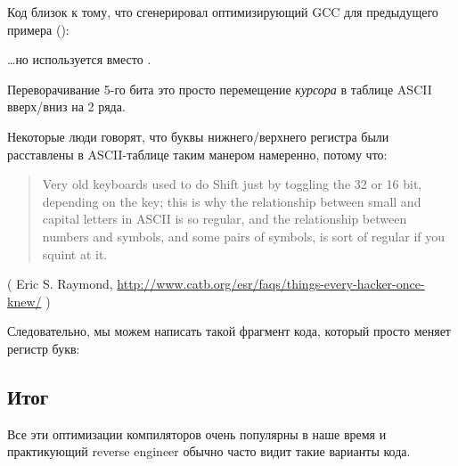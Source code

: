 

Код близок к тому, что сгенерировал оптимизирующий GCC для предыдущего примера ():



\dots но используется  вместо .

Переворачивание 5-го бита это просто перемещение \textit{курсора} в таблице \ac{ASCII} вверх/вниз на 2 ряда.

Некоторые люди говорят, что буквы нижнего/верхнего регистра были расставлены в \ac{ASCII}-таблице таким манером намеренно,
потому что:

\begin{framed}
\begin{quotation}
Very old keyboards used to do Shift just by toggling the 32 or 16 bit, depending on the key; this is why the relationship between small and capital letters in ASCII is so regular, and the relationship between numbers and symbols, and some pairs of symbols, is sort of regular if you squint at it.
\end{quotation}
\end{framed}

( Eric S. Raymond, \url{http://www.catb.org/esr/faqs/things-every-hacker-once-knew/} )

Следовательно, мы можем написать такой фрагмент кода, который просто меняет регистр букв:



\subsection{Итог}

Все эти оптимизации компиляторов очень популярны в наше время и практикующий
reverse engineer обычно часто видит такие варианты кода.
